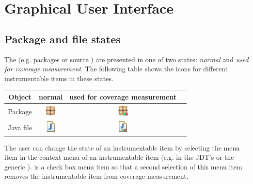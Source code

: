 \section{Graphical User Interface} \label{ui:User interface}
\subsection{Package and file states} \label{ui:Package and file states}
The  (e.g. packages or source ) are presented in one of two states: \textit{normal} and \textit{used for coverage measurement}. The following table shows the icons for different instrumentable items in these states.
{\small
  \begin{longtable}{|c|c|c|c|}\hline
   {\normalsize \textbf{Object}} &
   {\normalsize \textbf{normal}} &
   {\normalsize \textbf{used for coverage measurement}} \\\hline \hline \endhead
   Package & 
   \includegraphics[]{images/Package_Explorer/package_symbol} &
   \includegraphics[]{images/Package_Explorer/package_select_for_instrumentation} \\\hline
   Java file & 
   \includegraphics[]{images/Package_Explorer/java_file_symbol} &
   \includegraphics[]{images/Package_Explorer/java_file_select_for_instrumentation} \\\hline
  \end{longtable}
}
\par
The user can change the state of an instrumentable item by selecting the  menu item in the context menu of an instrumentable item (e.g. in the JDT's  or the generic ).  is a check box menu item so that a second selection of this menu item removes the instrumentable item from coverage measurement. 
 

